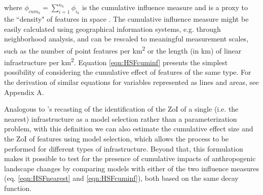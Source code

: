 \documentclass[titlepage]{article}
\begin{document}
where $\phi_{cum_k} = \sum_{i=1}^{n_k} \phi_{i_k}$ is the cumulative influence measure and is a proxy to 
the ``density" of features in space \citep[e.g.][]{panzacchi_searching_2015}. The cumulative influence measure might be easily calculated using geographical information systems, e.g. through neighborhood analysis, and can be rescaled to meaningful measurement scales, such as the number of point features per km\textsuperscript{2} or the length (in km) of linear infrastructure per km\textsuperscript{2}. Equation \ref{eqn:HSFcuminf} presents the simplest possibility of considering the cumulative effect of features of the same type. For the derivation of similar equations for variables represented as lines and areas, see Appendix A.

Analogous to \citet{lee_estimating_2020}'s recasting of the identification of the ZoI of a single (i.e. the nearest) infrastructure as a model selection rather than a parameterization problem, with this definition we can also estimate the cumulative effect size and the ZoI of features using model selection, which allows the process to be performed for different types of infrastructure. Beyond that, this formulation makes it possible to test for the presence of cumulative impacts of anthropogenic landscape changes by comparing models with either of the two influence measures (eq. \ref{eqn:HSFnearest} and \ref{eqn:HSFcuminf}), both based on the same decay function.




\end{document}
